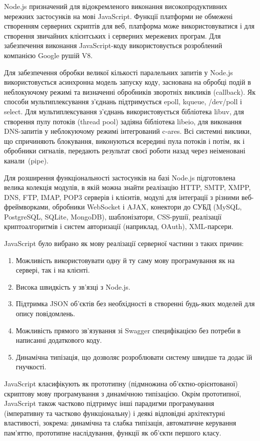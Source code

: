 \documentclass[../main.tex]{subfiles}
\begin{document}
		Node.js призначений для відокремленого виконання високопродуктивних мережних застосунків на мові JavaScript. Функції платформи не обмежені створенням серверних скриптів для веб, платформа може використовуватися і для створення звичайних клієнтських і серверних мережевих програм. Для забезпечення виконання JavaScript-коду використовується розроблений компанією Google рушій V8.
		
		Для забезпечення обробки великої кількості паралельних запитів у Node.js використовується асинхронна модель запуску коду, заснована на обробці подій в неблокуючому режимі та визначенні обробників зворотніх викликів (callback). Як способи мультиплексування з'єднань підтримується epoll, kqueue, /dev/poll і select. Для мультиплексування з'єднань використовується бібліотека libuv, для створення пулу потоків (thread pool) задіяна бібліотека libeio, для виконання DNS-запитів у неблокуючому режимі інтегрований c-ares. Всі системні виклики, що спричиняють блокування, виконуються всередині пула потоків і потім, як і обробники сигналів, передають результат своєї роботи назад через неіменовані канали~(pipe). %
		
		Для розширення функціональності застосунків на базі Node.js підготовлена велика колекція модулів, в якій можна знайти реалізацію HTTP, SMTP, XMPP, DNS, FTP, IMAP, POP3 серверів і клієнтів, модулі для інтеграції з різними веб-фреймворками, обробники WebSocket і AJAX, конектори до СУБД (MySQL, PostgreSQL, SQLite, MongoDB), шаблонізатори, CSS-рушії, реалізації криптоалгоритмів і систем авторизації (наприклад, OAuth), XML-парсери.
		
		JavaScript було вибрано як мову реалізації серверної частини з таких причин:
		\begin{enumerate}
			\item Можливість використовувати одну й ту саму мову програмування як на сервері, так і на клієнті.
			\item Висока швидкість у зв'язці з Node.js.
			\item Підтримка JSON об'єктів без необхідності в створенні будь-яких моделей для опису повідомлень.
			\item Можливість прямого зв'язування зі Swagger специфікацією без потреби в написанні додаткового коду.
			\item Динамічна типізація, що дозволяє розроблювати систему швидше та додає їй гнучкості.
		\end{enumerate}
		
		JavaScript класифікують як прототипну (підмножина об'єктно-\linebreak[0]орієнтованої) скриптову мову програмування з динамічною типізацією. Окрім прототипної, JavaScript також частково підтримує інші парадигми програмування (імперативну та частково функціональну) і деякі відповідні архітектурні властивості, зокрема: динамічна та слабка типізація, автоматичне керування пам'яттю, прототипне наслідування, функції як об'єкти першого класу.
		
\end{document}
